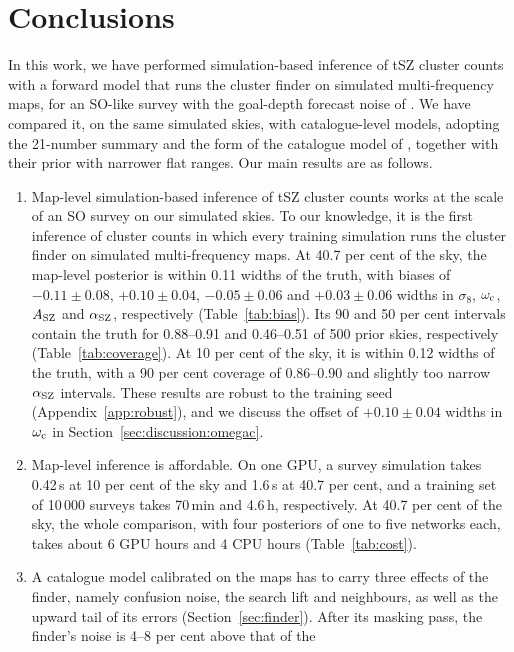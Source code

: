 \section{Conclusions}\label{sec:conclusions}

In this work, we have performed simulation-based inference of tSZ cluster counts with a forward model that
runs the cluster finder on simulated multi-frequency maps, for an SO-like survey with the goal-depth
forecast noise of \citet{SO2019}. We have compared it, on the same simulated skies, with catalogue-level
models, adopting the 21-number summary and the form of the catalogue model of \citet{Zubeldia2025},
together with their prior with narrower flat ranges. Our main results are as
follows.

\begin{enumerate}
\item Map-level simulation-based inference of tSZ cluster counts works at the scale of an SO survey on our
simulated skies. To our knowledge, it is the first inference of cluster counts in which every training
simulation runs the cluster finder on simulated multi-frequency maps. At 40.7 per cent of the sky, the
map-level posterior is within 0.11 widths of the truth, with biases of $-0.11\pm0.08$, $+0.10\pm0.04$,
$-0.05\pm0.06$ and $+0.03\pm0.06$ widths in $\sigma_8$, $\omega_\mathrm{c}$, $A_\mathrm{SZ}$ and $\alpha_\mathrm{SZ}$, respectively
(Table~\ref{tab:bias}). Its 90 and 50 per cent intervals contain the truth for 0.88--0.91 and 0.46--0.51
of 500 prior skies, respectively (Table~\ref{tab:coverage}). At 10 per cent of the sky, it is
within 0.12 widths of the truth, with a 90 per cent coverage of 0.86--0.90 and slightly too narrow $\alpha_\mathrm{SZ}$
intervals. These results are robust to the training seed (Appendix~\ref{app:robust}), and we discuss the
offset of $+0.10\pm0.04$ widths in $\omega_\mathrm{c}$ in Section~\ref{sec:discussion:omegac}.
\item Map-level inference is affordable. On one GPU, a survey simulation takes 0.42\,s at 10 per cent
of the sky and 1.6\,s at 40.7 per cent, and a training set of 10\,000 surveys takes 70\,min and 4.6\,h,
respectively. At 40.7 per cent of the sky, the whole comparison, with four posteriors of one to five
networks each, takes about 6 GPU hours and 4 CPU hours (Table~\ref{tab:cost}).
\item A catalogue model calibrated on the maps has to carry three effects of the finder, namely confusion
noise, the search lift and neighbours, as well as the upward tail of its errors
(Section~\ref{sec:finder}). After its masking pass, the finder's noise is 4--8 per cent above that of the

\end{enumerate}
